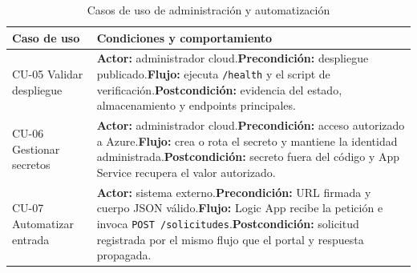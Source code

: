 \begin{table}[H]
\centering
\footnotesize
\renewcommand{\arraystretch}{1.16}
\begin{tabularx}{\textwidth}{p{3.3cm} X}
\textbf{Caso de uso} & \textbf{Condiciones y comportamiento} \\
\hline
CU-05 Validar despliegue & \textbf{Actor:} administrador cloud.\newline \textbf{Precondición:} despliegue publicado.\newline \textbf{Flujo:} ejecuta \texttt{/health} y el script de verificación.\newline \textbf{Postcondición:} evidencia del estado, almacenamiento y endpoints principales. \\
CU-06 Gestionar secretos & \textbf{Actor:} administrador cloud.\newline \textbf{Precondición:} acceso autorizado a Azure.\newline \textbf{Flujo:} crea o rota el secreto y mantiene la identidad administrada.\newline \textbf{Postcondición:} secreto fuera del código y App Service recupera el valor autorizado. \\
CU-07 Automatizar entrada & \textbf{Actor:} sistema externo.\newline \textbf{Precondición:} URL firmada y cuerpo JSON válido.\newline \textbf{Flujo:} Logic App recibe la petición e invoca \texttt{POST /solicitudes}.\newline \textbf{Postcondición:} solicitud registrada por el mismo flujo que el portal y respuesta propagada. \\
\end{tabularx}
\caption{Casos de uso de administración y automatización}
\label{tabla:casos-uso-administracion}
\end{table}

